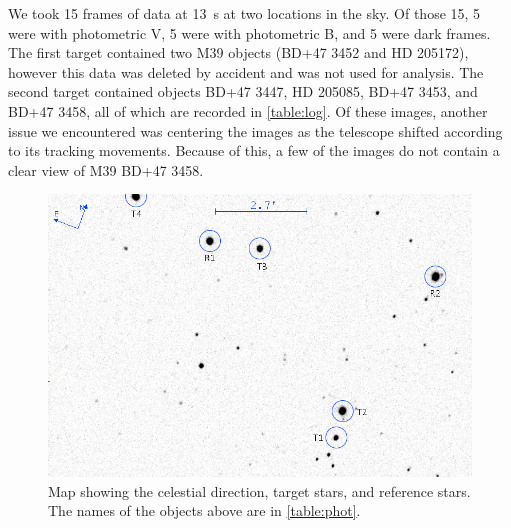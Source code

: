 \documentclass[%
aip,
jmp,
reprint,
floatfix
]{revtex4-1}
\begin{document}
	We took 15 frames of data at \SI{13}{\second} at two locations in the sky. Of those 15, 5 were with photometric V, 5 were with photometric B, and 5 were dark frames. The first target contained two M39 objects (BD+47 3452 and HD 205172), however this data was deleted by accident and was not used for analysis. The second target contained objects BD+47 3447, HD 205085, BD+47 3453, and BD+47 3458, all of which are recorded in \autoref{table:log}. Of these images, another issue we encountered was centering the images as the telescope shifted according to its tracking movements. Because of this, a few of the images do not contain a clear view of M39 BD+47 3458.
	
	\begin{figure}
		\includegraphics[width=\linewidth]{figs/M39_map.png}
		\caption{Map showing the celestial direction, target stars, and reference stars. The names of the objects above are in \autoref{table:phot}.}
		\label{fig:map}
			
	\end{figure}


\end{document}
